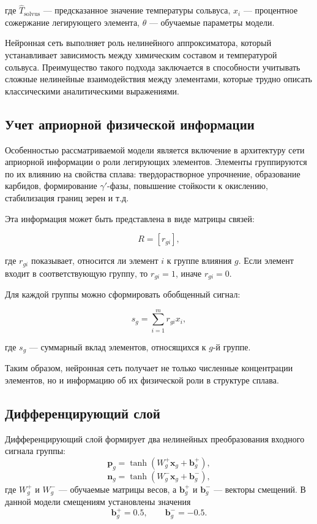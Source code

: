 где $\hat{T}_{\mathrm{solvus}}$ --- предсказанное значение температуры 
сольвуса, $x_i$ --- процентное сожержание легирующего элемента, 
$\theta$ --- обучаемые параметры модели.

Нейронная сеть выполняет роль нелинейного аппроксиматора, который 
устанавливает зависимость между химическим составом и температурой 
сольвуса. Преимущество такого подхода заключается в способности 
учитывать сложные нелинейные взаимодействия между элементами, которые 
трудно описать классическими аналитическими выражениями.

\subsection{Учет априорной физической информации}

Особенностью рассматриваемой модели является включение в архитектуру 
сети априорной информации о роли легирующих элементов. Элементы 
группируются по их влиянию на свойства сплава: твердорастворное 
упрочнение, образование карбидов, формирование $\gamma'$-фазы, 
повышение стойкости к окислению, стабилизация границ зерен и т.д.

Эта информация может быть представлена в виде матрицы связей:

\begin{equation}
R =
\left[
r_{gi}
\right],
\end{equation}

где $r_{gi}$ показывает, относится ли элемент $i$ к группе влияния $g$. 
Если элемент входит в соответствующую группу, то $r_{gi}=1$, 
иначе $r_{gi}=0$.

Для каждой группы можно сформировать обобщенный сигнал:

\begin{equation}
s_g =
\sum_{i=1}^{m}
r_{gi} x_i,
\end{equation}

где $s_g$ --- суммарный вклад элементов, относящихся к $g$-й группе.

Таким образом, нейронная сеть получает не только численные концентрации 
элементов, но и информацию об их физической роли в структуре сплава.

\subsection{Дифференцирующий слой}

Дифференцирующий слой формирует два нелинейных преобразования входного
сигнала группы:
$$\mathbf{p}_g =\tanh \left(W_g^{+}\mathbf{x}_g + \mathbf{b}_g^{+}\right),$$
$$\mathbf{n}_g =\tanh \left(W_g^{-}\mathbf{x}_g + \mathbf{b}_g^{-}\right),$$
где $W_g^{+}$ и $W_g^{-}$ — обучаемые матрицы весов, а
$\mathbf{b}_g^{+}$ и $\mathbf{b}_g^{-}$ — векторы смещений. В данной
модели смещениям установлены значения
$$\mathbf{b}_g^{+} = 0.5,\qquad\mathbf{b}_g^{-} = -0.5.$$

